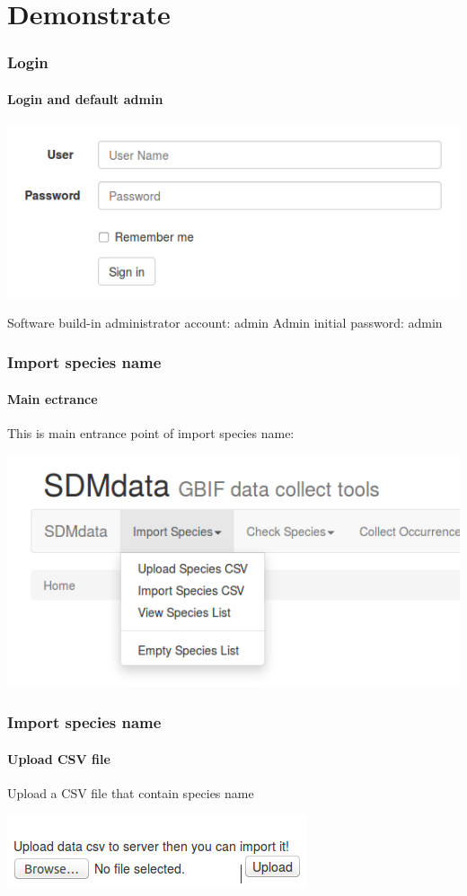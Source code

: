 \documentclass{beamer}
\begin{document}
\section{Demonstrate}
\begin{frame}
	\frametitle{Login}
	\framesubtitle{Login and default admin}
	\begin{center}
		\includegraphics[scale=0.3]{image/login.png}
	\end{center}
	Software build-in administrator account: admin
	\newline Admin initial password: admin
\end{frame}
\begin{frame}
	\frametitle{Import species name}
	\framesubtitle{Main ectrance}
	This is main entrance point of import species name:
	\begin{center}
		\includegraphics[scale=0.3]{image/import_species.png}
	\end{center}

\end{frame}
\begin{frame}
	\frametitle{Import species name}
	\framesubtitle{Upload CSV file}
	Upload a CSV file that contain species name 
	\begin{center}
		\includegraphics[scale=0.5]{image/upload_csv.png}
	\end{center}

\end{frame}
\end{document}
